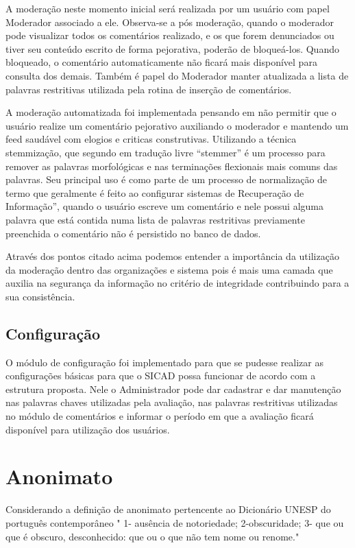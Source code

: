 \documentclass[12pt, a4paper]{report}
\begin{document}
A moderação neste momento inicial será realizada por um usuário com papel Moderador associado a ele. Observa-se a pós moderação, quando o moderador pode visualizar todos os comentários realizado, e os que forem denunciados ou tiver seu conteúdo escrito de forma pejorativa, poderão de bloqueá-los. Quando bloqueado, o comentário automaticamente não ficará mais disponível para consulta dos demais. Também é papel do Moderador manter atualizada a lista de palavras restritivas utilizada pela rotina de inserção de comentários. 


A moderação automatizada foi implementada pensando em não permitir que o usuário realize um comentário pejorativo auxiliando o moderador e mantendo um feed saudável com elogios e criticas construtivas. Utilizando a técnica stemmização, que segundo \cite{porter1980} em tradução livre “stemmer” é um processo para remover as palavras morfológicas e nas terminações flexionais mais comuns das palavras. Seu principal uso é como parte de um processo de normalização de termo que geralmente é feito ao configurar sistemas de Recuperação de Informação”, quando o usuário escreve um comentário e nele possui alguma palavra que está contida numa lista de palavras restritivas previamente preenchida o comentário não é persistido no banco de dados.  

Através dos pontos citado acima podemos entender a importância da utilização da moderação dentro das organizações e sistema pois é  mais uma camada que auxilia na segurança da informação no critério de integridade contribuindo para a sua consistência.

\subsection{Configuração}
O módulo de configuração foi implementado para que se pudesse realizar as configurações básicas para que o SICAD possa funcionar de acordo com a estrutura proposta. Nele o Administrador pode dar cadastrar e dar manutenção nas palavras chaves utilizadas pela avaliação, nas palavras restritivas utilizadas no módulo de comentários e informar o período em que a avaliação ficará disponível para utilização dos usuários.

\section{ Anonimato}

Considerando a definição de anonimato pertencente ao Dicionário UNESP do português contemporâneo " 1- ausência de notoriedade; 2-obscuridade; 3- que ou que é obscuro, desconhecido: que ou o que não tem nome ou renome." \cite[p. 75]{da2004dicionario} 
\end{document}
